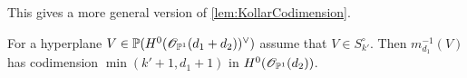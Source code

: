 This gives a more general version of \cref{lem:KollarCodimension}.
	\begin{lemma}[{= \cref{lem:MultiplicationMapCodimension}}]
		\label{lem:MultiplicationMapCodimensionHypersurfaces}
		For a hyperplane $V \in \mathbb{P}(H^0(\mathscr{O}_{\mathbb{P}^1}(d_1+d_2))^\vee)$ assume that $V \in S_{k'}^\circ$. 
		Then $m_{d_1}^{-1}(V)$ has codimension $\min(k'+1,d_1+1)$ in $H^0(\mathscr{O}_{\mathbb{P}^1}(d_2))$.
	\end{lemma}
%	

